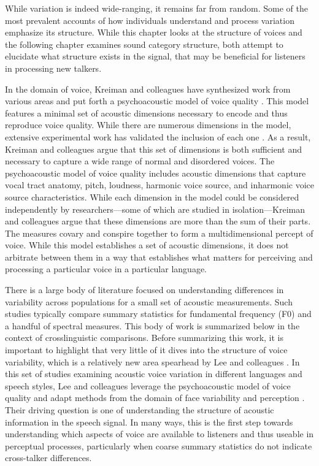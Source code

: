While variation is indeed wide-ranging, it remains far from random. Some of the most prevalent accounts of how individuals understand and process variation emphasize its structure. While this chapter looks at the structure of voices and the following chapter examines sound category structure, both attempt to elucidate what structure exists in the signal, that may be beneficial for listeners in processing new talkers. 

In the domain of voice, Kreiman and colleagues have synthesized work from various areas and put forth a psychoacoustic model of voice quality \citep{kreiman_2014_theory}. This model features a minimal set of acoustic dimensions necessary to encode and thus reproduce voice quality. While there are numerous dimensions in the model, extensive experimental work has validated the inclusion of each one \citep[][and references therein]{kreiman_2021_validating}. As a result, Kreiman and colleagues argue that this set of dimensions is both sufficient and necessary to capture a wide range of normal and disordered voices. The psychoacoustic model of voice quality includes acoustic dimensions that capture vocal tract anatomy, pitch, loudness, harmonic voice source, and inharmonic voice source characteristics. While each dimension in the model could be considered independently by researchers---some of which are studied in isolation---Kreiman and colleagues argue that these dimensions are more than the sum of their parts. The measures covary and conspire together to form a multidimensional percept of voice. While this model establishes a set of acoustic dimensions, it does not arbitrate between them in a way that establishes what matters for perceiving and processing a particular voice in a particular language. 

There is a large body of literature focused on understanding differences in variability across populations for a small set of acoustic measurements. Such studies typically compare summary statistics for fundamental frequency (F0) and a handful of spectral measures. This body of work is summarized below in the context of crosslinguistic comparisons. Before summarizing this work, it is important to highlight that very little of it dives into the structure of voice variability, which is a relatively new area spearhead by Lee and colleagues \citep{lee_2019_acoustic, lee_2019_spontaneous, lee_2020_language}. In this set of studies examining acoustic voice variation in different languages and speech styles, Lee and colleagues leverage the psychoacoustic model of voice quality \citep{kreiman_2014_theory} and adapt methods from the domain of face variability and perception \citep{burton_2016_faces}. Their driving question is one of understanding the structure of acoustic information in the speech signal. In many ways, this is the first step towards understanding which aspects of voice are available to listeners and thus useable in perceptual processes, particularly when coarse summary statistics do not indicate cross-talker differences. 

